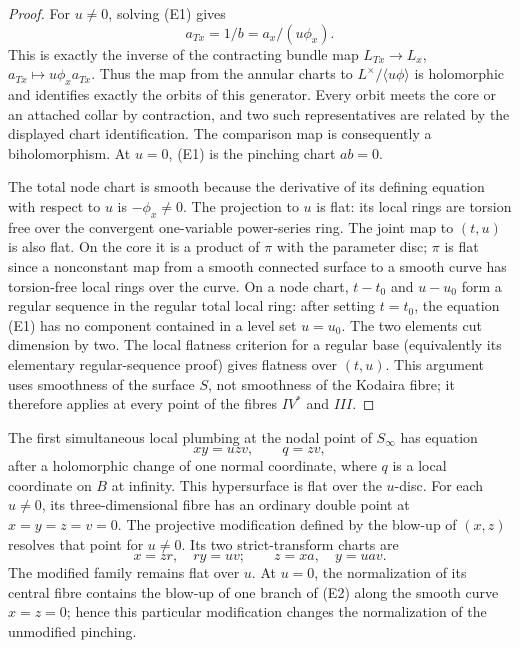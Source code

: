 \begin{proof}
For $u\ne0$, solving (E1) gives
\[
              a_{Tx}=1/b=a_x/(u\phi_x).
\]
This is exactly the inverse of the contracting bundle map
$L_{Tx}\to L_x$, $a_{Tx}\mapsto u\phi_xa_{Tx}$. Thus the map from
the annular charts to $L^\times/\langle u\phi\rangle$ is holomorphic
and identifies exactly the orbits of this generator. Every orbit
meets the core or an attached collar by contraction, and two such
representatives are related by the displayed chart identification.
The comparison map is consequently a biholomorphism. At $u=0$,
(E1) is the pinching chart $ab=0$.

The total node chart is smooth because the derivative of its defining
equation with respect to $u$ is $-\phi_x\ne0$. The projection to $u$
is flat: its local rings are torsion free over the convergent
one-variable power-series ring. The joint map to $(t,u)$ is also
flat. On the core it is a product of $\pi$ with the parameter disc;
$\pi$ is flat since a nonconstant map from a smooth connected surface
to a smooth curve has torsion-free local rings over the curve. On a
node chart, $t-t_0$ and $u-u_0$ form a regular sequence in the regular
total local ring: after setting $t=t_0$, the equation (E1) has no
component contained in a level set $u=u_0$. The two elements cut
dimension by two. The local flatness criterion for a regular base
(equivalently its elementary regular-sequence proof) gives flatness
over $(t,u)$. This argument uses smoothness of the surface $S$, not
smoothness of the Kodaira fibre; it therefore applies at every point
of the fibres $IV^*$ and $III$.
\end{proof}

\begin{proposition}\label{fam:src:E.1.3}\label{fam:st:E.1.3}
The first simultaneous local plumbing at the nodal point of $S_\infty$
has equation
\[
                 xy=u zv,\qquad q=zv,                         \tag{E2}
\]
after a holomorphic change of one normal coordinate, where $q$ is a
local coordinate on $B$ at infinity. This hypersurface is flat over
the $u$-disc. For each $u\ne0$, its three-dimensional fibre has an
ordinary double point at $x=y=z=v=0$. The projective modification
defined by the blow-up of $(x,z)$ resolves that point for $u\ne0$.
Its two strict-transform charts are
\[
       x=zr,\quad ry=uv;
       \qquad z=xa,\quad y=uav.                               \tag{E3}
\]
The modified family remains flat over $u$. At $u=0$, the normalization
of its central fibre contains the blow-up of one branch of (E2) along
the smooth curve $x=z=0$; hence this particular modification changes
the normalization of the unmodified pinching.
\end{proposition}


